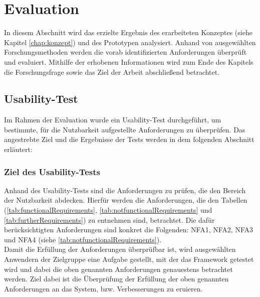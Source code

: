 \chapter{Evaluation}
\label{chap:evaluation}
In diesem Abschnitt wird das erzielte Ergebnis des erarbeiteten Konzeptes (siehe Kapitel \ref{chap:konzept}) und des 
Prototypen analysiert. Anhand von ausgewählten Forschungsmethoden werden die vorab identifizierten Anforderungen überprüft 
und evaluiert. Mithilfe der erhobenen Informationen wird zum Ende des Kapitels die Forschungsfrage sowie das
Ziel der Arbeit abschließend betrachtet. 

\section{Usability-Test}
\label{sec:usabilitytest}
    Im Rahmen der Evaluation wurde ein Usability-Test durchgeführt, um bestimmte, für die Nutzbarkeit aufgestellte Anforderungen zu 
    überprüfen.
    Das angestrebte Ziel und die Ergebnisse der Tests werden in dem folgenden Abschnitt erläutert:
    
    \subsection{Ziel des Usability-Tests}
        Anhand des Usability-Tests sind die Anforderungen zu prüfen, die den Bereich der Nutzbarkeit abdecken. 
        Hierfür werden die Anforderungen, die den Tabellen (\ref{tab:functionalRequirements}, \ref{tab:notfunctionalRequirements} und \ref{tab:furtherRequirements}) 
        zu entnehmen sind, betrachtet. Die dafür berücksichtigten Anforderungen sind konkret die Folgenden: NFA1, NFA2, NFA3 und NFA4 (siehe \ref{tab:notfunctionalRequirements}).
        \\
        Damit die Erfüllung der Anforderungen überprüfbar ist, wird ausgewählten Anwendern der Zielgruppe %
        eine Aufgabe gestellt, mit der das Framework getestet wird und dabei die oben genannten Anforderungen genauestens betrachtet werden. 
        Ziel dabei ist die Überprüfung der Erfüllung der oben genannten Anforderungen an das System, bzw. Verbesserungen zu eruieren. 

